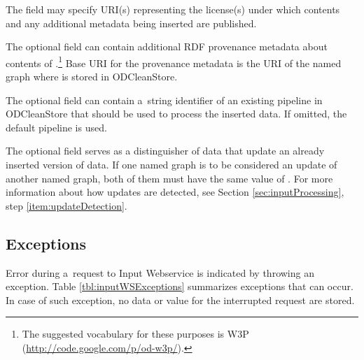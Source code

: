 The  field may specify URI(s) representing the license(s) under which  contents and any additional  metadata being inserted are published. 

The optional  field can contain additional RDF provenance metadata about contents of .\footnote{The suggested vocabulary for these purposes is W3P (\url{http://code.google.com/p/od-w3p/}).} Base URI for the provenance metadata is the URI of the named graph where  is stored in ODCleanStore.

The optional  field can contain a~string identifier of an existing pipeline in ODCleanStore that should be used to process the inserted data. If omitted, the default pipeline is used. 

The optional  field serves as a distinguisher of data that update an already inserted version of data. If one named graph is to be considered an update of another named graph, both of them must have the same value of . For more information about how updates are detected, see Section \ref{sec:inputProcessing}, step \ref{item:updateDetection}.

\subsection{Exceptions}

Error during a~request to Input Webservice is indicated by throwing an exception. Table \ref{tbl:inputWSExceptions} summarizes exceptions that can occur. In case of such exception, no data or  value for the interrupted request are stored.


